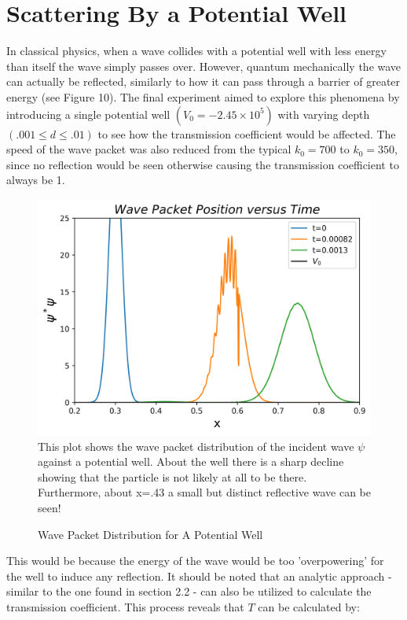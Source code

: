 \documentclass[twocolumn]{article}
\begin{document}
\section{Scattering By a Potential Well}
\hspace{\parindent} In classical physics, when a wave collides with a potential well with less energy than itself the wave simply passes over. However, quantum mechanically the wave can actually be reflected, similarly to how it can pass through a barrier of greater energy (see Figure 10). The final experiment aimed to explore this phenomena by introducing a single potential well $(V_0=-2.45\times10^5)$ with varying depth $(.001\leq d\leq.01)$ to see how the transmission coefficient would be affected. The speed of the wave packet was also reduced from the typical $k_0=700$ to $k_0=350$, since no reflection would be seen otherwise causing the transmission coefficient to always be 1.
\begin{figure}[hb]
\centering
\caption{Wave Packet Distribution for A Potential Well}
\includegraphics[scale=.5]{Position4}
\small{This plot shows the wave packet distribution of the incident wave $\psi$ against a potential well. About the well there is a sharp decline showing that the particle is not likely at all to be there. Furthermore, about x=.43 a small but distinct reflective wave can be seen!}
\end{figure}
This would be because the energy of the wave would be too 'overpowering' for the well to induce any reflection. It should be noted that an analytic approach - similar to the one found in section 2.2 - can also be utilized to calculate the transmission coefficient. This process reveals that $T$ can be calculated by:
\end{document}
